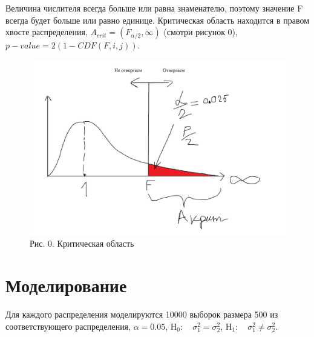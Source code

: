 \documentclass[12pt]{disser}
\begin{document}
Величина числителя всегда больше или равна знаменателю, поэтому значение F всегда будет больше или равно единице. Критическая область находится в правом хвосте распределения, $A_{c r i t}=\left(F_{\alpha/2}, \infty\right)$ (смотри рисунок 0), $p-value = 2(1-CDF(F, i, j))$. 
\begin{figure}
	
	\centering
	
	\includegraphics[width=0.8\linewidth]{Screenshot_2.png}
	\caption*{Рис. 0. Критическая область}
	\label{fig:mpr}
	
\end{figure}
\setcounter{figure}{0}
\section*{Моделирование}
Для каждого распределения моделируются 10000 выборок размера 500 из соответствующего распределения, $\alpha = 0.05$, $\mathrm{H}_{0}: \quad \sigma_{1}^{2}=\sigma_{2}^{2}$, $\mathrm{H}_{1}: \quad \sigma_{1}^{2} \neq \sigma_{2}^{2}$.
\end{document}
